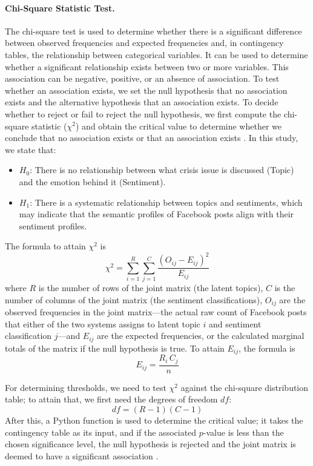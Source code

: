 \documentclass[12pt,a4paper]{report}
\begin{document}
\paragraph{Chi-Square Statistic Test.} The chi-square test is used to determine
whether there is a significant difference between observed frequencies and
expected frequencies and, in contingency tables, the relationship between
categorical variables. It can be used to determine whether a significant
relationship exists between two or more variables. This association can be
negative, positive, or an absence of association. To test whether an association
exists, we set the null hypothesis that no association exists and the
alternative hypothesis that an association exists. To decide whether to reject
or fail to reject the null hypothesis, we first compute the chi-square statistic
($\chi^2$) and obtain the critical value to determine whether we conclude that
no association exists or that an association exists \parencite{singh2020}. In this
study, we state that:
\begin{itemize}
  \item $H_0$: There is no relationship between what crisis issue is discussed
        (Topic) and the emotion behind it (Sentiment).
  \item $H_1$: There is a systematic relationship between topics and sentiments,
        which may indicate that the semantic profiles of Facebook posts align
        with their sentiment profiles.
\end{itemize}

The formula to attain $\chi^2$ is
\begin{equation}
  \chi^2 = \sum_{i=1}^{R} \sum_{j=1}^{C}
           \frac{\left(O_{ij} - E_{ij}\right)^2}{E_{ij}}
  \label{eq:chisq}
\end{equation}
where $R$ is the number of rows of the joint matrix (the latent topics), $C$ is
the number of columns of the joint matrix (the sentiment classifications),
$O_{ij}$ are the observed frequencies in the joint matrix---the actual raw count
of Facebook posts that either of the two systems assigns to latent topic $i$ and
sentiment classification $j$---and $E_{ij}$ are the expected frequencies, or
the calculated marginal totals of the matrix if the null hypothesis is true. To
attain $E_{ij}$, the formula is
\begin{equation}
  E_{ij} = \frac{R_i \, C_j}{n}
  \label{eq:expected}
\end{equation}

For determining thresholds, we need to test $\chi^2$ against the chi-square
distribution table; to attain that, we first need the degrees of freedom $df$:
\begin{equation}
  df = (R - 1)(C - 1)
  \label{eq:df}
\end{equation}
After this, a Python function is used to determine the critical value; it takes
the contingency table as its input, and if the associated $p$-value is less
than the chosen significance level, the null hypothesis is rejected and the
joint matrix is deemed to have a significant association \parencite{singh2020}.
\end{document}
